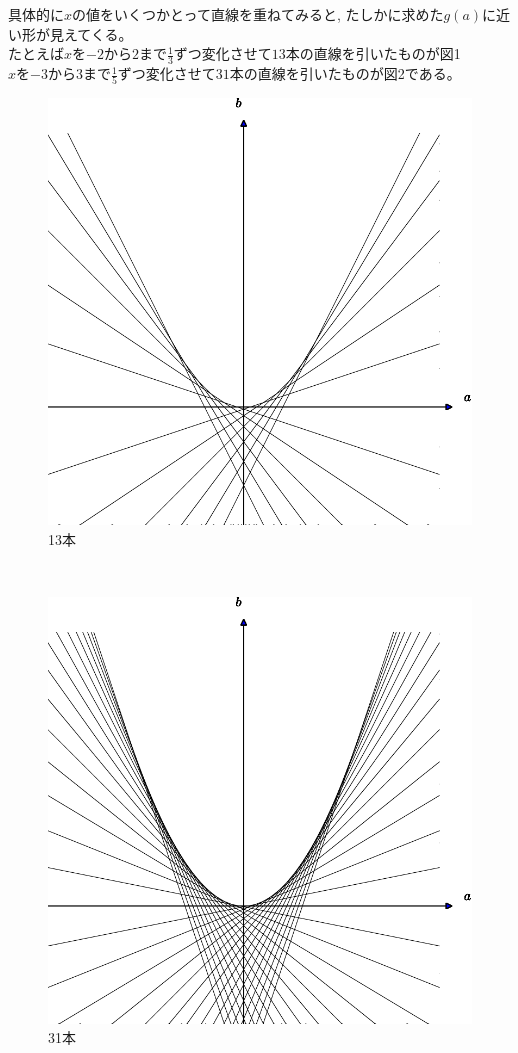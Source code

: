 \documentclass[11pt,a4j,fleqn]{jarticle}
\begin{document}
具体的に$x$の値をいくつかとって直線を重ねてみると, たしかに求めた$g(a)$に近い形が見えてくる。\\
たとえば$x$を$-2$から$2$まで$\displaystyle{\frac{1}{3}}$ずつ変化させて$13$本の直線を引いたものが図1\\
$x$を$-3$から$3$まで$\displaystyle{\frac{1}{5}}$ずつ変化させて$31$本の直線を引いたものが図2である。\\
\begin{figure}[p]
 \centering
 \includegraphics[scale=0.7]{envelope0.pdf}
 \caption{13本}
 \label{fig:1}
\end{figure}
\\
\begin{figure}[p]
 \centering
 \includegraphics[scale=0.7]{envelope1.pdf}
 \caption{31本}
 \label{fig:2}
\end{figure}
\end{document}
